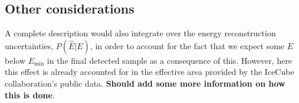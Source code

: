 \documentclass[fontsize=12pt]{article}
\begin{document}
\subsection{Other considerations}
A complete description would also integrate over the energy reconstruction uncertainties, $P(\hat{E} | E)$, in order to account for the fact that we expect some $E$ below $E_\mathrm{min}$ in the final detected sample as a consequence of this. However, here this effect is already accounted for in the effective area provided by the IceCube collaboration's public data. \textbf{Should add some more information on how this is done}.


\end{document}
